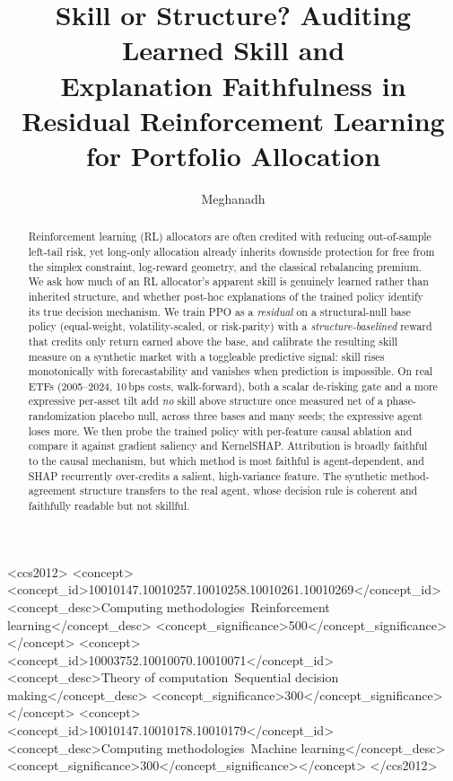 \documentclass[sigconf,anonymous,review]{acmart}
\begin{document}
\title{Skill or Structure? Auditing Learned Skill and\\ Explanation Faithfulness in Residual Reinforcement Learning\\ for Portfolio Allocation}

\author{Meghanadh}
\renewcommand{\shortauthors}{Anonymous}

\begin{abstract}
Reinforcement learning (RL) allocators are often credited with reducing
out-of-sample left-tail risk, yet long-only allocation already inherits downside
protection for free from the simplex constraint, log-reward geometry, and the
classical rebalancing premium. We ask how much of an RL allocator's apparent skill
is genuinely learned rather than inherited structure, and whether post-hoc
explanations of the trained policy identify its true decision mechanism. We train
PPO as a \emph{residual} on a structural-null base policy (equal-weight,
volatility-scaled, or risk-parity) with a \emph{structure-baselined} reward that
credits only return earned above the base, and calibrate the resulting skill
measure on a synthetic market with a toggleable predictive signal: skill rises
monotonically with forecastability and vanishes when prediction is impossible. On
real ETFs (2005--2024, 10\,bps costs, walk-forward), both a scalar de-risking gate
and a more expressive per-asset tilt add \emph{no} skill above structure once
measured net of a phase-randomization placebo null, across three bases and many
seeds; the expressive agent loses more. We then probe the trained policy with
per-feature causal ablation and compare it against gradient saliency and
KernelSHAP. Attribution is broadly faithful to the causal mechanism, but which
method is most faithful is agent-dependent, and SHAP recurrently over-credits a
salient, high-variance feature. The synthetic method-agreement structure transfers
to the real agent, whose decision rule is coherent and faithfully readable but not
skillful.
\end{abstract}

\begin{CCSXML}
<ccs2012>
 <concept><concept_id>10010147.10010257.10010258.10010261.10010269</concept_id>
 <concept_desc>Computing methodologies~Reinforcement learning</concept_desc>
 <concept_significance>500</concept_significance></concept>
 <concept><concept_id>10003752.10010070.10010071</concept_id>
 <concept_desc>Theory of computation~Sequential decision making</concept_desc>
 <concept_significance>300</concept_significance></concept>
 <concept><concept_id>10010147.10010178.10010179</concept_id>
 <concept_desc>Computing methodologies~Machine learning</concept_desc>
 <concept_significance>300</concept_significance></concept>
</ccs2012>
\end{CCSXML}
\end{document}
